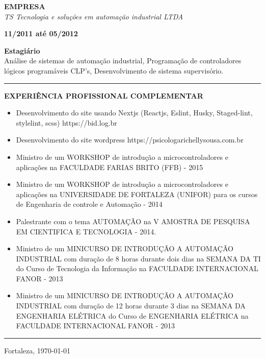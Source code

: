 \documentclass[12pt, a4paper]{article}
\newcommand{\LlinhaG}{2pt} %
\newcommand{\TlinhaG}{17cm}  %
\newcommand{\LlinhaM}{1pt} 	 %
\newcommand{\TlinhaM}{17cm}		 %
\begin{document}
\begin{multicols}{2}
	\begin{flushleft}
		\textbf{EMPRESA}\\
		\textit{TS Tecnologia e soluções em automação industrial LTDA}\\
	\end{flushleft}
	\vfill
	\begin{flushright}
		\textbf{11/2011 até 05/2012}\\
	\end{flushright}
\end{multicols}
\begin{flushleft}
	\textbf{Estagiário}\\
	Análise de sistemas de automação industrial, Programação de controladores lógicos programáveis CLP’s, Desenvolvimento de sistema supervisório.\\
\end{flushleft}

\begin{center}
	\rule{\TlinhaM}{\LlinhaM}
\end{center}


\begin{center}
	\textbf{EXPERIÊNCIA PROFISSIONAL COMPLEMENTAR}\\
\end{center}
\begin{itemize}
	\item Desenvolvimento do site usando Nextjs (Reactjs, Eslint, Husky, Staged-lint, stylelint, scss) https://bid.log.br
	\item Desenvolvimento do site wordpress https://psicologarichellysousa.com.br
	\item Ministro de um WORKSHOP  de introdução a microcontroladores e aplicações na FACULDADE FARIAS BRITO (FFB) - 2015
	\item Ministro de um WORKSHOP  de introdução a microcontroladores e aplicações na UNIVERSIDADE DE FORTALEZA (UNIFOR) para os cursos de Engenharia de controle e Automação - 2014
	\item Palestrante com o tema AUTOMAÇÃO  na V AMOSTRA DE PESQUISA EM CIENTIFICA E TECNOLOGIA - 2014.
	\item Ministro de um MINICURSO DE INTRODUÇÃO A AUTOMAÇÃO INDUSTRIAL com duração de 8 horas durante dois dias na SEMANA DA TI do Curso de Tecnologia da Informação na FACULDADE INTERNACIONAL FANOR - 2013
	\item Ministro de um MINICURSO DE INTRODUÇÃO A AUTOMAÇÃO INDUSTRIAL com duração de 12 horas durante 3 dias na SEMANA DA ENGENHARIA ELÉTRICA do Curso de ENGENHARIA ELÉTRICA na FACULDADE INTERNACIONAL FANOR - 2013
\end{itemize}

\begin{center}
	\rule{\TlinhaG}{\LlinhaG}
\end{center}

\vspace{5cm}
\begin{center}
	\noindent Fortaleza, \today  %
\end{center}
\end{document}
